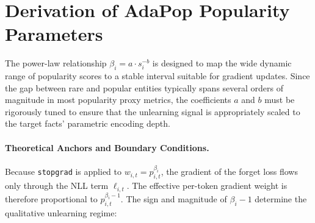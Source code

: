 






\section{Derivation of AdaPop Popularity Parameters}
\label{app:derivation}

The power-law relationship $\beta_i = a \cdot s_i^{-b}$ is designed to map the wide dynamic range of popularity scores to a stable interval suitable for gradient updates. Since the gap between rare and popular entities typically spans several orders of magnitude in most popularity proxy metrics, the coefficients $a$ and $b$ must be rigorously tuned to ensure that the unlearning signal is appropriately scaled to the target facts' parametric encoding depth.

\paragraph{Theoretical Anchors and Boundary Conditions.}
Because \texttt{stopgrad} is applied to $w_{i,t} = p_{i,t}^{\beta_i}$, the gradient of the forget loss flows only through the NLL term $\ell_{i,t}$. The effective per-token gradient weight is therefore proportional to $p_{i,t}^{\beta_i - 1}$. The sign and magnitude of $\beta_i - 1$ determine the qualitative unlearning regime:

